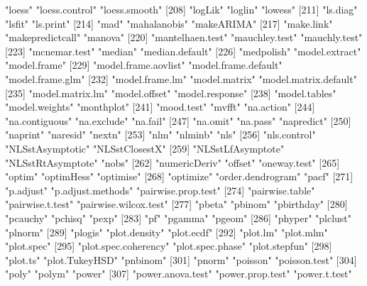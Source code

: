 \documentclass[tutorial.tex]{subfiles}
\begin{document}
\begin{Schunk}
\begin{Soutput}
[205] "loess"                "loess.control"        "loess.smooth"        
[208] "logLik"               "loglin"               "lowess"              
[211] "ls.diag"              "lsfit"                "ls.print"            
[214] "mad"                  "mahalanobis"          "makeARIMA"           
[217] "make.link"            "makepredictcall"      "manova"              
[220] "mantelhaen.test"      "mauchley.test"        "mauchly.test"        
[223] "mcnemar.test"         "median"               "median.default"      
[226] "medpolish"            "model.extract"        "model.frame"         
[229] "model.frame.aovlist"  "model.frame.default"  "model.frame.glm"     
[232] "model.frame.lm"       "model.matrix"         "model.matrix.default"
[235] "model.matrix.lm"      "model.offset"         "model.response"      
[238] "model.tables"         "model.weights"        "monthplot"           
[241] "mood.test"            "mvfft"                "na.action"           
[244] "na.contiguous"        "na.exclude"           "na.fail"             
[247] "na.omit"              "na.pass"              "napredict"           
[250] "naprint"              "naresid"              "nextn"               
[253] "nlm"                  "nlminb"               "nls"                 
[256] "nls.control"          "NLSstAsymptotic"      "NLSstClosestX"       
[259] "NLSstLfAsymptote"     "NLSstRtAsymptote"     "nobs"                
[262] "numericDeriv"         "offset"               "oneway.test"         
[265] "optim"                "optimHess"            "optimise"            
[268] "optimize"             "order.dendrogram"     "pacf"                
[271] "p.adjust"             "p.adjust.methods"     "pairwise.prop.test"  
[274] "pairwise.table"       "pairwise.t.test"      "pairwise.wilcox.test"
[277] "pbeta"                "pbinom"               "pbirthday"           
[280] "pcauchy"              "pchisq"               "pexp"                
[283] "pf"                   "pgamma"               "pgeom"               
[286] "phyper"               "plclust"              "plnorm"              
[289] "plogis"               "plot.density"         "plot.ecdf"           
[292] "plot.lm"              "plot.mlm"             "plot.spec"           
[295] "plot.spec.coherency"  "plot.spec.phase"      "plot.stepfun"        
[298] "plot.ts"              "plot.TukeyHSD"        "pnbinom"             
[301] "pnorm"                "poisson"              "poisson.test"        
[304] "poly"                 "polym"                "power"               
[307] "power.anova.test"     "power.prop.test"      "power.t.test"        

\end{Soutput}
\end{Schunk}
\end{document}
